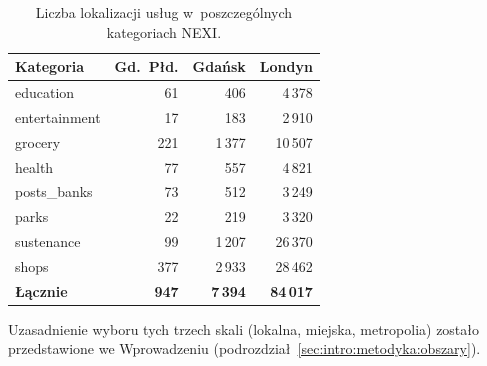 \begin{table}[ht]
\centering
\caption{Liczba lokalizacji usług w~poszczególnych kategoriach NEXI.}
\label{tab:uslugi_kategorie}
\begin{tabular}{l r r r}
\hline
\textbf{Kategoria} & \textbf{Gd.\ Płd.} & \textbf{Gdańsk} & \textbf{Londyn} \\
\hline
education     & 61   & 406   & 4\,378 \\
entertainment & 17   & 183   & 2\,910 \\
grocery       & 221  & 1\,377 & 10\,507 \\
health        & 77   & 557   & 4\,821 \\
posts\_banks  & 73   & 512   & 3\,249 \\
parks         & 22   & 219   & 3\,320 \\
sustenance    & 99   & 1\,207 & 26\,370 \\
shops         & 377  & 2\,933 & 28\,462 \\
\hline
\textbf{Łącznie} & \textbf{947} & \textbf{7\,394} & \textbf{84\,017} \\
\hline
\end{tabular}
\end{table}

Uzasadnienie wyboru tych trzech skali (lokalna, miejska, metropolia)
zostało przedstawione we Wprowadzeniu (podrozdział~\ref{sec:intro:metodyka:obszary}).
